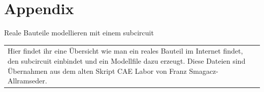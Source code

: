 \section{Appendix}

\begin{frame}[t]{Reale Bauteile modellieren mit einem subcircuit}

    \begin{spacing}{0.9} \begin{tiny}
            \begin{table}[h!]
                \begin{tabular}{p{5cm} p{5cm}}
                    \begin{minipage}{0.5\textwidth}
                        Hier findet ihr eine Übersicht wie man ein reales Bauteil im Internet findet,
                        den subcircuit einbindet und ein Modellfile dazu erzeugt. Diese Dateien sind Übernahmen
                        aus dem alten Skript CAE Labor von Franz Smagacz-Allramseder. \newline


\end{minipage}
\end{tabular}
\end{table}
\end{tiny}
\end{spacing}
\end{frame}

